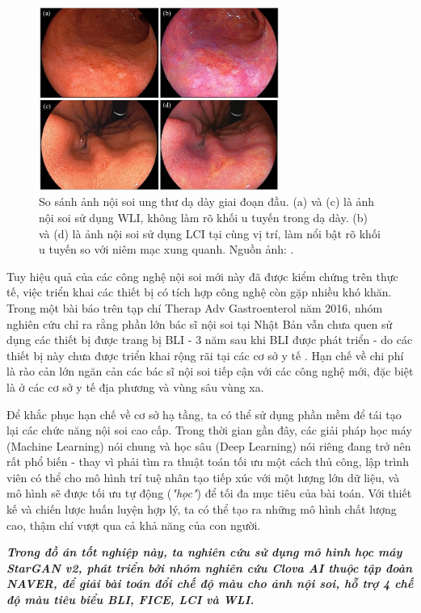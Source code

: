 \documentclass[12pt]{extreport}
\begin{document}
\begin{figure}[H]
    \centering
    \includegraphics[width=0.7\textwidth]{figure1}
    \caption{So sánh ảnh nội soi ung thư dạ dày giai đoạn đầu. (a) và (c) là ảnh nội soi sử dụng WLI, không làm rõ khối u tuyến trong dạ dày. (b) và (d) là ảnh nội soi sử dụng LCI tại cùng vị trí, làm nổi bật rõ khối u tuyến so với niêm mạc xung quanh. Nguồn ảnh: \cite{pmid31700545}.}
    \label{wli-lci}
\end{figure}

Tuy hiệu quả của các công nghệ nội soi mới này đã được kiểm chứng trên thực tế, việc triển khai các thiết bị có tích hợp công nghệ còn gặp nhiều khó khăn. Trong một bài báo trên tạp chí Therap Adv Gastroenterol năm 2016, nhóm nghiên cứu chỉ ra rằng phần lớn bác sĩ nội soi tại Nhật Bản vẫn chưa quen sử dụng các thiết bị được trang bị BLI - 3 năm sau khi BLI được phát triển - do các thiết bị này chưa được triển khai rộng rãi tại các cơ sở y tế \cite{pmid26770267}. Hạn chế về chi phí là rào cản lớn ngăn cản các bác sĩ nội soi tiếp cận với các công nghệ mới, đặc biệt là ở các cơ sở y tế địa phương và vùng sâu vùng xa.

Để khắc phục hạn chế về cơ sở hạ tầng, ta có thể sử dụng phần mềm để tái tạo lại các chức năng nội soi cao cấp. Trong thời gian gần đây, các giải pháp học máy (Machine Learning) nói chung và học sâu (Deep Learning) nói riêng đang trở nên rất phổ biến - thay vì phải tìm ra thuật toán tối ưu một cách thủ công, lập trình viên có thể cho mô hình trí tuệ nhân tạo tiếp xúc với một lượng lớn dữ liệu, và mô hình sẽ được tối ưu tự động (\textit{"học"}) để tối đa mục tiêu của bài toán. Với thiết kế và chiến lược huấn luyện hợp lý, ta có thể tạo ra những mô hình chất lượng cao, thậm chí vượt qua cả khả năng của con người.

\textit{\textbf{Trong đồ án tốt nghiệp này, ta nghiên cứu sử dụng mô hình học máy StarGAN v2, phát triển bởi nhóm nghiên cứu Clova AI thuộc tập đoàn NAVER, để giải bài toán đổi chế độ màu cho ảnh nội soi, hỗ trợ 4 chế độ màu tiêu biểu BLI, FICE, LCI và WLI.}}
\end{document}
